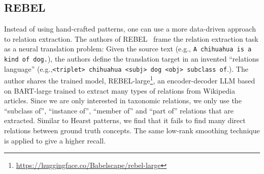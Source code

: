 

\subsection{REBEL}

Instead of using hand-crafted patterns, one can use a more data-driven approach to relation extraction. The authors of REBEL~\cite{cabot2021rebel} frame the relation extraction task as a neural translation problem: Given the source text (e.g., \texttt{A chihuahua is a kind of dog.}), the authors define the translation target in an invented ``relations language'' (e.g.,\texttt{<triplet> chihuahua <subj> dog <obj> subclass of}.). The author shares the trained model, REBEL-large\footnote{\url{https://huggingface.co/Babelscape/rebel-large}}, an encoder-decoder LLM based on BART-large \cite{lewis2019bart} trained to extract many types of relations from Wikipedia articles. Since we are only interested in taxonomic relations, we only use the ``subclass of'', ``instance of'', ``member of'' and ``part of'' relations that are extracted. Similar to Hearst patterns, we find that it fails to find many direct relations between ground truth concepts. The same low-rank smoothing technique is applied to give a higher recall.

